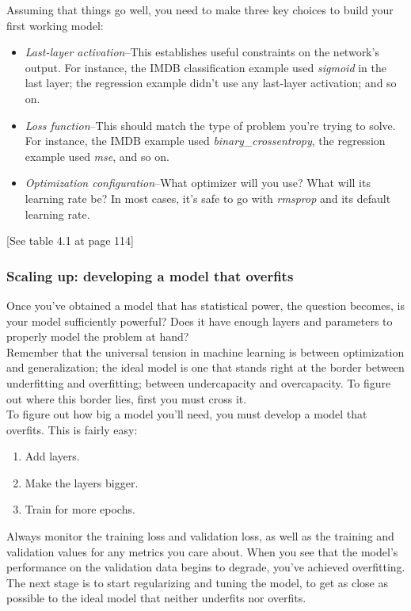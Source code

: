 \documentclass{article}
\numberwithin{equation}{section} %
\begin{document}
Assuming that things go well, you need to make three key choices to build your
first working model:

\begin{itemize}
	\item \textit{Last-layer activation}--This establishes useful constraints on the network’s output. For instance, the IMDB classification example used \textit{sigmoid} in the last layer; the regression example didn’t use any last-layer activation; and so on.
	\item \textit{Loss function}--This should match the type of problem you’re trying to solve. For instance, the IMDB example used \textit{binary\_crossentropy}, the regression example used \textit{mse}, and so on.
	\item \textit{Optimization configuration}--What optimizer will you use? What will its learning rate be? In most cases, it’s safe to go with \textit{rmsprop} and its default learning rate.
\end{itemize}

[See table 4.1 at page 114]


\subsubsection{Scaling up: developing a model that overfits}

Once you’ve obtained a model that has statistical power, the question becomes, is your model sufficiently powerful? Does it have enough layers and parameters to properly model the problem at hand? \\

Remember that the universal tension in machine learning is between optimization and generalization; the ideal model is one that stands right at the border between underfitting and overfitting; between undercapacity and overcapacity. To figure out where this border lies, first you must cross it. \\

To figure out how big a model you’ll need, you must develop a model that overfits.
This is fairly easy:

\begin{enumerate}
	\item Add layers.
	\item Make the layers bigger.
	\item Train for more epochs.
\end{enumerate}

Always monitor the training loss and validation loss, as well as the training and validation values for any metrics you care about. When you see that the model’s performance on the validation data begins to degrade, you’ve achieved overfitting.
The next stage is to start regularizing and tuning the model, to get as close as possible to the ideal model that neither underfits nor overfits.
\end{document}
